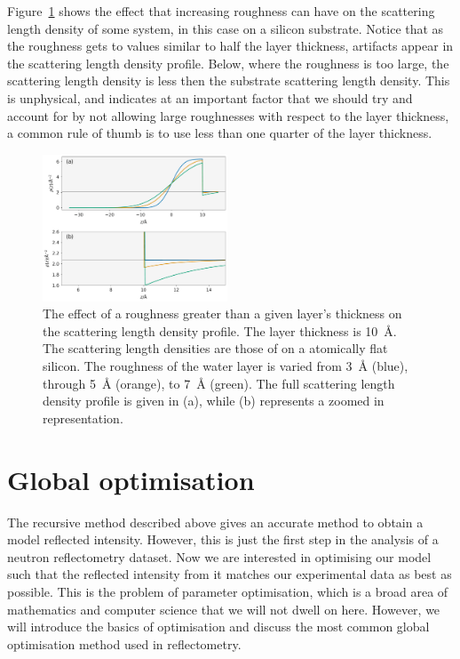 \documentclass[
 reprint,
 superscriptaddress,
 amsmath,amssymb,
 aps,
]{revtex4-1}
\begin{document}
Figure~\ref{fig:rough} shows the effect that increasing roughness can have on the scattering length density of some system, in this case  on a silicon substrate. 
Notice that as the roughness gets to values similar to half the layer thickness, artifacts appear in the scattering length density profile. 
Below, where the roughness is too large, the scattering length density is less then the substrate scattering length density. 
This is unphysical, and indicates at an important factor that we should try and account for by not allowing large roughnesses with respect to the layer thickness, a common rule of thumb is to use less than one quarter of the layer thickness. 
%
\begin{figure}[t]
    \includegraphics[width=0.49\textwidth]{roughness}
    \caption{The effect of a roughness greater than a given layer's thickness on the scattering length density profile. The layer thickness is \SI{10}{\angstrom}. The scattering length densities are those of  on a atomically flat silicon. The roughness of the water layer is varied from \SI{3}{\angstrom} (blue), through \SI{5}{\angstrom} (orange), to \SI{7}{\angstrom} (green). The full scattering length density profile is given in (a), while (b) represents a zoomed in representation.}
    \label{fig:rough}
\end{figure}
%

\section{Global optimisation}
The recursive method described above gives an accurate method to obtain a model reflected intensity. 
However, this is just the first step in the analysis of a neutron reflectometry dataset. 
Now we are interested in optimising our model such that the reflected intensity from it matches our experimental data as best as possible. 
This is the problem of parameter optimisation, which is a broad area of mathematics and computer science that we will not dwell on here. 
However, we will introduce the basics of optimisation and discuss the most common global optimisation method used in reflectometry. 
\end{document}
